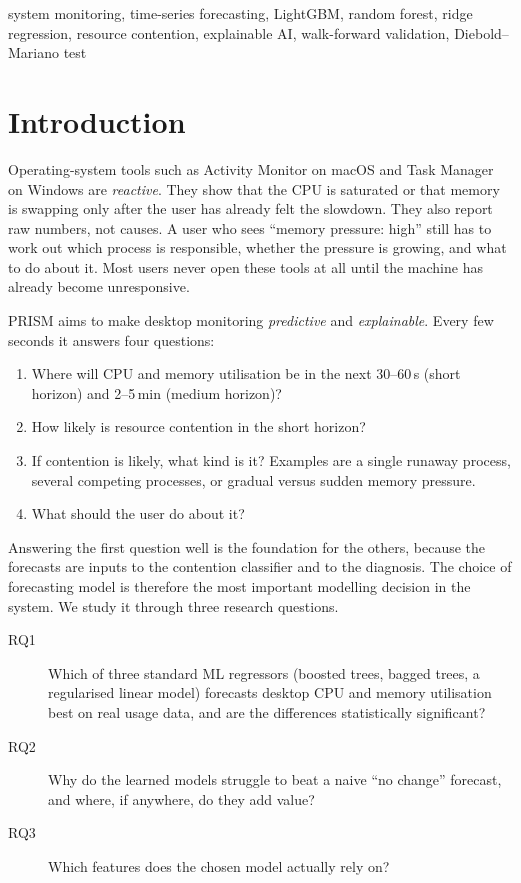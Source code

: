 \documentclass[conference]{IEEEtran}
\begin{document}
\begin{IEEEkeywords}
system monitoring, time-series forecasting, LightGBM, random forest, ridge
regression, resource contention, explainable AI, walk-forward validation,
Diebold--Mariano test
\end{IEEEkeywords}

\section{Introduction}
Operating-system tools such as Activity Monitor on macOS and Task Manager on
Windows are \emph{reactive}. They show that the CPU is saturated or that
memory is swapping only after the user has already felt the slowdown. They
also report raw numbers, not causes. A user who sees ``memory pressure:
high'' still has to work out which process is responsible, whether the
pressure is growing, and what to do about it. Most users never open these
tools at all until the machine has already become unresponsive.

PRISM aims to make desktop monitoring \emph{predictive} and
\emph{explainable}. Every few seconds it answers four questions:
\begin{enumerate}
  \item Where will CPU and memory utilisation be in the next 30--60\,s
        (short horizon) and 2--5\,min (medium horizon)?
  \item How likely is resource contention in the short horizon?
  \item If contention is likely, what kind is it? Examples are a single
        runaway process, several competing processes, or gradual versus
        sudden memory pressure.
  \item What should the user do about it?
\end{enumerate}

Answering the first question well is the foundation for the others, because
the forecasts are inputs to the contention classifier and to the diagnosis.
The choice of forecasting model is therefore the most important modelling
decision in the system. We study it through three research questions.
\begin{description}
  \item[RQ1] Which of three standard ML regressors (boosted trees, bagged
        trees, a regularised linear model) forecasts desktop CPU and memory
        utilisation best on real usage data, and are the differences
        statistically significant?
  \item[RQ2] Why do the learned models struggle to beat a naive ``no
        change'' forecast, and where, if anywhere, do they add value?
  \item[RQ3] Which features does the chosen model actually rely on?
\end{description}
\end{document}
